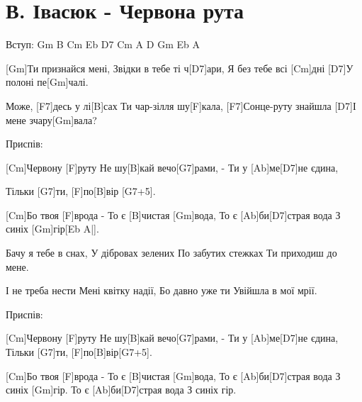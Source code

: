 \section{В. Івасюк - Червона рута}
\begin{guitar}
Вступ: Gm B Cm Eb D7 Cm A D Gm Eb A\guitarSharp

[Gm]Ти признайся мені,
Звідки в тебе ті ч[D7]ари,
Я без тебе всі [Cm]дні
[D7]У полоні пе[Gm]чалі.

Може, [F7]десь у лі[B]сах
Ти чар-зілля шу[F]кала,
[F7]Сонце-руту знайшла
[D7]І мене зчару[Gm]вала?

Приспів:

[Cm]Червону [F]руту
Не шу[B]кай вечо[G7]рами, -
Ти у [Ab]ме[D7]не єдина,
                     
Тільки [G7]ти, [F]по[B]вір [G7+5].

[Cm]Бо твоя [F]врода -
То є [B]чистая [Gm]вода,
То є [Ab]би[D7]страя вода
З синіх [Gm]гір[Eb A\guitarSharp|].

Бачу я тебе в снах,
У дібровах зелених
По забутих стежках
Ти приходиш до мене.

І не треба нести
Мені квітку надії,
Бо давно уже ти
Увійшла в мої мрії.

Приспів:

[Cm]Червону [F]руту
Не шу[B]кай вечо[G7]рами, -
Ти у [Ab]ме[D7]не єдина,
Тільки [G7]ти, [F]по[B]вір[G7+5].

[Cm]Бо твоя [F]врода -
То є [B]чистая [Gm]вода,
То є [Ab]би[D7]страя вода
З синіх [Gm]гір.
То є [Ab]би[D7]страя вода
З синіх гір.
\end{guitar}